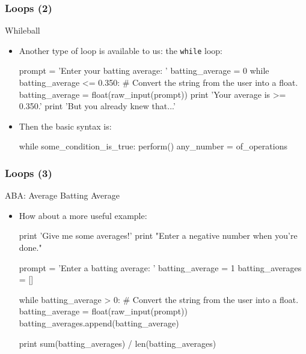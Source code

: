 \documentclass[10pt]{beamer}
\begin{document}
\begin{frame}[fragile]
  \frametitle{Loops (2)}
  \begin{block}{Whileball}
    \begin{itemize}
      \item Another type of loop is available to us: the \texttt{while} loop:
        \begin{pythoncode}
  prompt = 'Enter your batting average: '
  batting_average = 0
  while batting_average <= 0.350:
    # Convert the string from the user into a float.
    batting_average = float(raw_input(prompt))
  print 'Your average is >= 0.350.'
  print 'But you already knew that...'
        \end{pythoncode}
      \item Then the basic syntax is:
        \begin{pythoncode}
  while some_condition_is_true:
    perform()
    any_number = of_operations
        \end{pythoncode}
    \end{itemize}
  \end{block}
\end{frame}

\begin{frame}[fragile]
  \frametitle{Loops (3)}
  \begin{block}{ABA: Average Batting Average}
    \begin{itemize}
      \item How about a more useful example:
        \begin{pythoncode}
  print 'Give me some averages!'
  print "Enter a negative number when you're done."

  prompt = 'Enter a batting average: '
  batting_average = 1
  batting_averages = []

  while batting_average > 0:
    # Convert the string from the user into a float.
    batting_average = float(raw_input(prompt))
    batting_averages.append(batting_average)

  print sum(batting_averages) / len(batting_averages)
        \end{pythoncode}
    \end{itemize}
  \end{block}
\end{frame}
\end{document}
